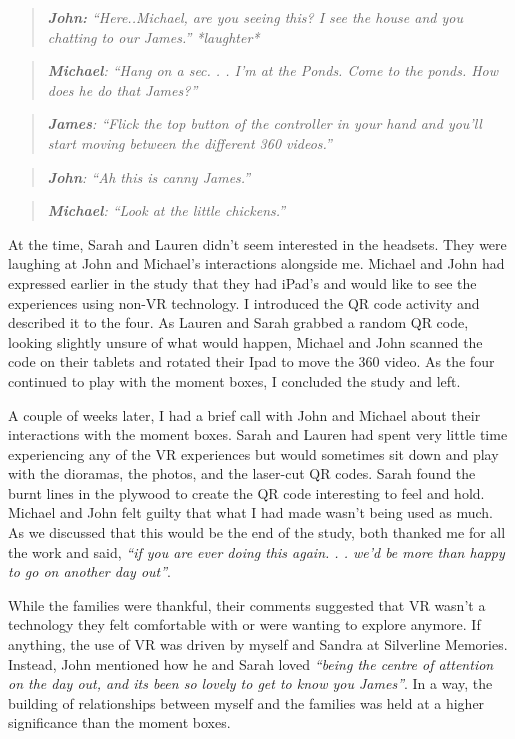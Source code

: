 \begin{quote}
\textit{    \textbf{John:} ``Here..Michael, are you seeing this? I see the house and you chatting to our James.'' *laughter*
}
\end{quote}
\begin{quote}
\textit{    \textbf{Michael}: ``Hang on a sec. . . I'm at the Ponds. Come to the ponds. How does he do that James?''
}
\end{quote}
\begin{quote}
\textit{    \textbf{James}: ``Flick the top button of the controller in your hand and you'll start moving between the different 360 videos.''
}
\end{quote}
\begin{quote}
\textit{   \textbf{ John}: ``Ah this is canny James.''
}
\end{quote}
\begin{quote}
\textit{    \textbf{Michael}: ``Look at the little chickens.''}
\end{quote}
At the time, Sarah and Lauren didn't seem interested in the headsets. They were laughing at John and Michael's interactions alongside me. Michael and John had expressed earlier in the study that they had iPad's and would like to see the experiences using non-VR technology. I introduced the QR code activity and described it to the four. As Lauren and Sarah grabbed a random QR code, looking slightly unsure of what would happen, Michael and John scanned the code on their tablets and rotated their Ipad to move the 360 video. As the four continued to play with the moment boxes, I concluded the study and left.

A couple of weeks later, I had a brief call with John and Michael about their interactions with the moment boxes. Sarah and Lauren had spent very little time experiencing any of the VR experiences but would sometimes sit down and play with the dioramas, the photos, and the laser-cut QR codes. Sarah found the burnt lines in the plywood to create the QR code interesting to feel and hold. Michael and John felt guilty that what I had made wasn't being used as much. As we discussed that this would be the end of the study, both thanked me for all the work and said, \textit{``if you are ever doing this again. . . we'd be more than happy to go on another day out''}.

While the families were thankful, their comments suggested that VR wasn’t a technology they felt comfortable with or were wanting to explore anymore. If anything, the use of VR was driven by myself and Sandra at Silverline Memories. Instead, John mentioned how he and Sarah loved \textit{``being the centre of attention on the day out, and its been so lovely to get to know you James''}. In a way, the building of relationships between myself and the families was held at a higher significance than the moment boxes.

